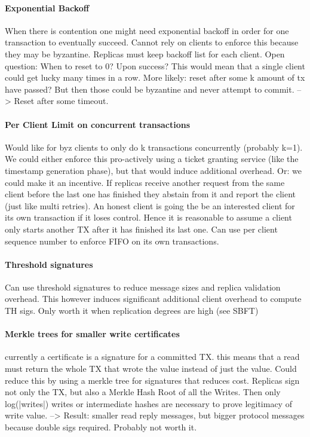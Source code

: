 \paragraph{Exponential Backoff}
When there is contention one might need exponential backoff in order for one transaction to eventually succeed. Cannot rely on clients to enforce this because they may be byzantine. Replicas must keep backoff list for each client.
Open question: When to reset to 0? Upon success? This would mean that a single client could get lucky many times in a row. More likely: reset after some k amount of tx have passed? But then those could be byzantine and never attempt to commit. --> Reset after some timeout.


\paragraph{Per Client Limit on concurrent transactions}
Would like for byz clients to only do k transactions concurrently (probably k=1). We could either enforce this pro-actively using a ticket granting service (like the timestamp generation phase), but that would induce additional overhead. Or: we could make it an incentive. If replicas receive another request from the same client before the last one has finished they abstain from it and report the client (just like multi retries). An honest client is going the be an interested client for its own transaction if it loses control. Hence it is reasonable to assume a client only starts another TX after it has finished its last one. Can use per client sequence number to enforce FIFO on its own transactions.

\paragraph{Threshold signatures}
Can use threshold signatures to reduce message sizes and replica validation overhead. This however induces significant additional client overhead to compute TH sigs. Only worth it when replication degrees are high (see SBFT)

\paragraph{Merkle trees for smaller write certificates}
currently a certificate is a signature for a committed TX. this means that a read must return the whole TX that wrote the value instead of just the value. Could reduce this by using a merkle tree for signatures that reduces cost.
Replicas sign not only the TX, but also a Merkle Hash Root of all the Writes. Then only log(|writes|) writes or intermediate hashes are necessary to prove legitimacy of write value.
--> Result: smaller read reply messages, but bigger protocol messages because double sigs required. Probably not worth it.

